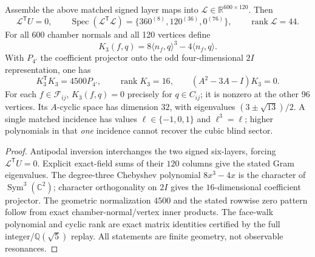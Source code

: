 \documentclass[11pt]{article}
\begin{document}
\begin{theorem}
\label{p1:thm:v366-signed-cubic-chamber}
Assemble the above matched signed layer maps into
$\mathcal L\in\mathbb R^{600\times120}$.  Then
\[
 \mathcal L^{\mathsf T}U=0,\qquad
 \operatorname{Spec}(\mathcal L^{\mathsf T}\mathcal L)
 =\{360^{(8)},120^{(36)},0^{(76)}\},\qquad
 \operatorname{rank}\mathcal L=44.
\]
For all 600 chamber normals and all 120 vertices define
\[
 K_3(f,q)=8\langle n_f,q\rangle^3-4\langle n_f,q\rangle.
\]
With $P_{4'}$ the coefficient projector onto the odd
four-dimensional $2I$ representation, one has
\[
 \boxed{K_3^{\mathsf T}K_3=4500P_{4'}},\qquad
 \operatorname{rank}K_3=16,\qquad
 (A^2-3A-I)K_3=0.
\]
For each $f\in\mathscr F_{ij}$, $K_3(f,q)=0$ precisely for
$q\in C_{ij}$; it is nonzero at the other 96 vertices.
Its $A$-cyclic space has dimension $32$, with eigenvalues
$(3\pm\sqrt{13})/2$.  A single matched incidence has values
$\ell\in\{-1,0,1\}$ and $\ell^3=\ell$; higher polynomials in
that \emph{one} incidence cannot recover the cubic blind sector.
\end{theorem}
\begin{proof}
Antipodal inversion interchanges the two signed six-layers,
forcing $\mathcal L^{\mathsf T}U=0$.  Explicit exact-field sums
of their $120$ columns give the stated Gram eigenvalues.
The degree-three Chebyshev polynomial $8x^3-4x$ is the character
of $\operatorname{Sym}^3(\mathbb C^2)$; character orthogonality
on $2I$ gives the $16$-dimensional coefficient projector.
The geometric normalization $4500$ and the stated rowwise zero
pattern follow from exact chamber-normal/vertex inner products.
The face-walk polynomial and cyclic rank are exact matrix identities
certified by the full integer/$\mathbb Q(\sqrt5)$ replay.  All
statements are finite geometry, not observable resonances.
\end{proof}
\end{document}
